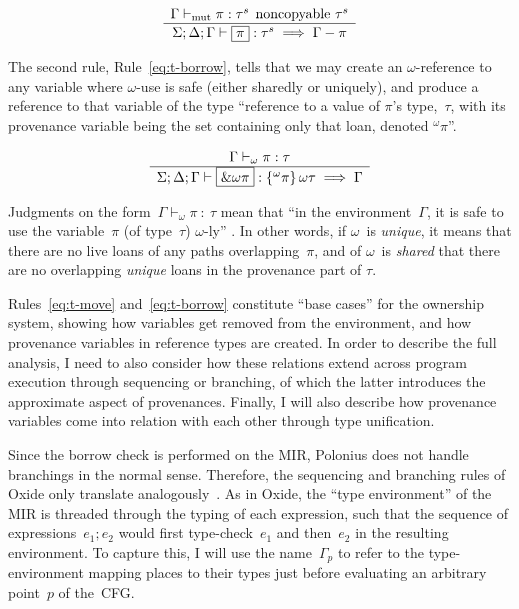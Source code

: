 \documentclass[11pt,a4paper,twoside,openany]{report}
\newcommand{\expression}[1]{\boxed{#1}}
\newcommand{\ntyperule}[2]{\begin{array}{c}#1\\\hline\raisebox{1pt}{\strut}#2\end{array}}
\begin{document}
\begin{equation}\label{eq:t-move}
  \ntyperule{\Gamma \vdash_{\text{mut}} \pi : \tau^s \:\: \text{noncopyable } \tau^s}
  {\Sigma ; \Delta ; \Gamma \vdash \expression{\pi} : \tau^s \implies \Gamma - \pi}
  \end{equation}

  The second rule, Rule~\eqref{eq:t-borrow}, tells that we may create an
  $\omega$-reference to any variable where $\omega$-use is safe (either sharedly
  or uniquely), and produce a reference to that variable of the type ``reference
  to a value of $\pi$'s type,~$\tau$, with its provenance variable being the set
  containing only that loan, denoted $^{\omega}\pi$''.

\begin{equation}\label{eq:t-borrow}
  \ntyperule{\Gamma \vdash_{\omega} \pi : \tau}
  {\Sigma ; \Delta ; \Gamma \vdash \expression{\&\omega \pi} : \left \{ ^{\omega}\pi\right \} \omega \tau \implies \Gamma}
\end{equation}

Judgments on the form~$\Gamma \vdash_{\omega} \pi \: : \: \tau$ mean that ``in
the environment~$\Gamma$, it is safe to use the variable~$\pi$ (of type~$\tau$)
$\omega$-ly'' \cite{weiss_oxide:_2019}. In other words, if $\omega$~is
\emph{unique}, it means that there are no live loans of any paths
overlapping~$\pi$, and of $\omega$~is \emph{shared} that there are no
overlapping \emph{unique} loans in the provenance part of $\tau$.

Rules~\eqref{eq:t-move} and~\eqref{eq:t-borrow} constitute ``base cases'' for
the ownership system, showing how variables get removed from the environment,
and how provenance variables in reference types are created. In order to
describe the full analysis, I need to also consider how these relations extend
across program execution through sequencing or branching, of which the latter
introduces the approximate aspect of provenances. Finally, I will also describe
how provenance variables come into relation with each other through type
unification.

Since the borrow check is performed on the MIR, Polonius does not handle
branchings in the normal sense. Therefore, the sequencing and branching rules of
Oxide only translate analogously~\cite{weiss_oxide:_2019}. As in Oxide, the
``type environment'' of the MIR is threaded through the typing of each
expression, such that the sequence of expressions~$\expression{e_1; e_2}$ would
first type-check~$e_1$ and then~$e_2$ in the resulting environment. To capture
this, I will use the name~$\Gamma_p$ to refer to the type-environment mapping
places to their types just before evaluating an arbitrary point~$p$ of the~CFG.
\end{document}
